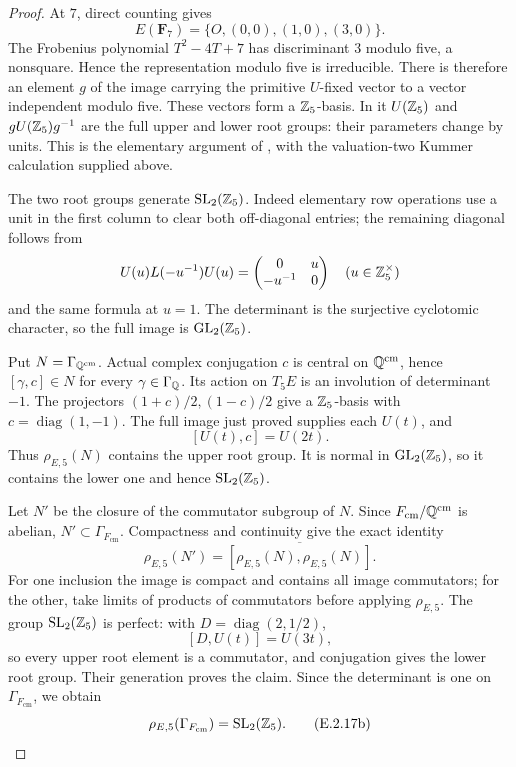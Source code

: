 \begin{proof}
At \(7\), direct counting gives
\[
 E(\mathbf F_7)=\{O,(0,0),(1,0),(3,0)\}.
\]
The Frobenius polynomial \(T^2-4T+7\) has discriminant
\(3\) modulo five, a nonsquare. Hence the representation
modulo five is irreducible.
There is therefore an element \(g\) of the image carrying
the primitive \(U\)-fixed vector to a vector independent
modulo five. These vectors form a \(\mathbb Z_5\)-basis.
In it \(U(\mathbb Z_5)\) and \(gU(\mathbb Z_5)g^{-1}\) are the full
upper and lower root groups: their parameters change by
units. This is the elementary argument of
\cite[pp.265--266]{GenConradWong1999}, with the
valuation-two Kummer calculation supplied above.

The two root groups generate \(\mathrm{SL}_2(\mathbb Z_5)\).
Indeed elementary row operations use a unit in the first
column to clear both off-diagonal entries; the remaining
diagonal follows from
\[
 U(u)L(-u^{-1})U(u)
   =\begin{pmatrix}0&u\\-u^{-1}&0\end{pmatrix}
 \quad(u\in\mathbb Z_5^\times)
\]
and the same formula at \(u=1\).
The determinant is the surjective cyclotomic character, so
the full image is \(\operatorname{GL}_2(\mathbb Z_5)\).

Put \(N=\Gamma_{\mathbb Q^{\mathrm{cm}}}\).
Actual complex conjugation \(c\) is central on
\(\mathbb Q^{\mathrm{cm}}\), hence
\([\gamma,c]\in N\) for every \(\gamma\in\Gamma_{\mathbb Q}\).
Its action on \(T_5E\) is an involution of determinant
\(-1\). The projectors \((1+c)/2,(1-c)/2\) give a
\(\mathbb Z_5\)-basis with \(c=\operatorname{diag}(1,-1)\).
The full image just proved supplies each \(U(t)\), and
\[
 [U(t),c]=U(2t).
\]
Thus \(\rho_{E,5}(N)\) contains the upper root group.
It is normal in \(\operatorname{GL}_2(\mathbb Z_5)\), so it contains the lower
one and hence \(\mathrm{SL}_2(\mathbb Z_5)\).

Let \(N'\) be the closure of the commutator subgroup of
\(N\). Since \(F_{\mathrm{cm}}/\mathbb Q^{\mathrm{cm}}\) is
abelian, \(N'\subset\Gamma_{F_{\mathrm{cm}}}\).
Compactness and continuity give the exact identity
\[
 \rho_{E,5}(N')
  =\overline{[\rho_{E,5}(N),\rho_{E,5}(N)]}.
\]
For one inclusion the image is compact and contains all
image commutators; for the other, take limits of products
of commutators before applying \(\rho_{E,5}\).
The group \(\mathrm{SL}_2(\mathbb Z_5)\) is perfect:
with \(D=\operatorname{diag}(2,1/2)\),
\[
 [D,U(t)]=U(3t),
\]
so every upper root element is a commutator, and conjugation
gives the lower root group. Their generation proves the
claim. Since the determinant is one on
\(\Gamma_{F_{\mathrm{cm}}}\), we obtain
\[
 \rho_{E,5}(\Gamma_{F_{\mathrm{cm}}})
       =\mathrm{SL}_2(\mathbb Z_5).
 \tag{E.2.17b}
\]


\end{proof}
